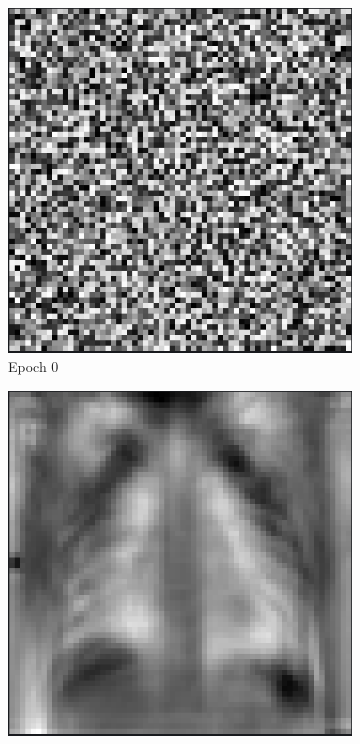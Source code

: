 \documentclass{article}
\begin{document}
\begin{figure}[!ht]
\centering
\caption*{Evolution of weights over epochs}
\begin{subfigure}{0.22\textwidth}
  \includegraphics[width=\linewidth]{assets/perceptron/training-1-epoch-0.png}
  \caption*{Epoch 0}\label{fig:training-1-epoch-0}
\end{subfigure}
\xspace
\begin{subfigure}{0.22\textwidth}
  \includegraphics[width=\linewidth]{assets/perceptron/training-1-epoch-1.png}

\end{subfigure}
\end{figure}
\end{document}
